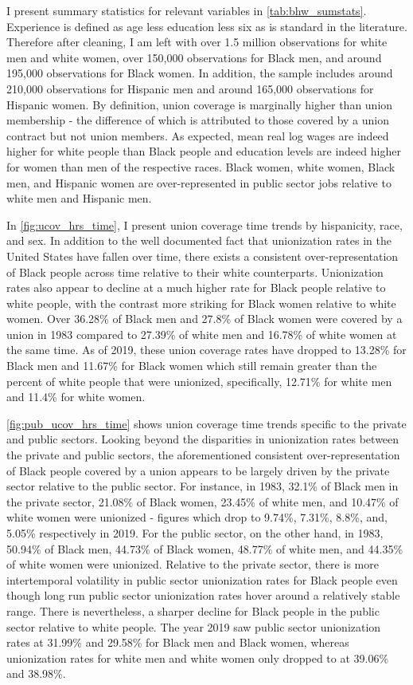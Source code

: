 \documentclass[11pt]{article}
\begin{document}
I present summary statistics for relevant variables in \autoref{tab:bhw_sumstats}. Experience is defined as age less education less six as is standard in the literature. Therefore after cleaning, I am left with over 1.5 million observations for white men and white women, over 150,000 observations for Black men, and around 195,000 observations for Black women. In addition, the sample includes around 210,000 observations for Hispanic men and around 165,000 observations for Hispanic women. By definition, union coverage is marginally higher than union membership - the difference of which is attributed to those covered by a union contract but not union members. As expected, mean real log wages are indeed higher for white people than Black people and education levels are indeed higher for women than men of the respective races. Black women, white women, Black men, and Hispanic women are over-represented in public sector jobs relative to white men and Hispanic men. 

In \autoref{fig:ucov_hrs_time}, I present union coverage time trends by hispanicity, race, and sex. In addition to the well documented fact that unionization rates in the United States have fallen over time, there exists a consistent over-representation of Black people across time relative to their white counterparts. Unionization rates also appear to decline at a much higher rate for Black people relative to white people, with the contrast more striking for Black women relative to white women. Over 36.28\% of Black men and 27.8\% of Black women were covered by a union in 1983 compared to 27.39\% of white men and 16.78\% of white women at the same time. As of 2019, these union coverage rates have dropped to 13.28\% for Black men and 11.67\% for Black women which still remain greater than the percent of white people that were unionized, specifically, 12.71\% for white men and 11.4\% for white women. 

\autoref{fig:pub_ucov_hrs_time} shows union coverage time trends specific to the private and public sectors. Looking beyond the disparities in unionization rates between the private and public sectors, the aforementioned consistent over-representation of Black people covered by a union appears to be largely driven by the private sector relative to the public sector. For instance, in 1983, 32.1\% of Black men in the private sector, 21.08\% of Black women, 23.45\% of white men, and 10.47\% of white women were unionized - figures which drop to 9.74\%, 7.31\%, 8.8\%, and, 5.05\% respectively in 2019. For the public sector, on the other hand, in 1983, 50.94\% of Black men, 44.73\% of Black women, 48.77\% of white men, and 44.35\% of white women were unionized. Relative to the private sector, there is more intertemporal volatility in public sector unionization rates for Black people even though long run public sector unionization rates hover around a relatively stable range. There is nevertheless, a sharper decline for Black people in the public sector relative to white people. The year 2019 saw public sector unionization rates at 31.99\% and 29.58\% for Black men and Black women, whereas unionization rates for white men and white women only dropped to at 39.06\% and 38.98\%.
\end{document}
